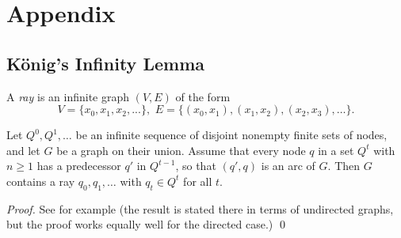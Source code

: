 \documentclass{llncs}
\begin{document}



\newpage
\appendix
\section{Appendix}


\subsection{K\"onig's Infinity Lemma}


A \emph{ray} is an infinite graph $(V, E)$ of the form
$$ V = \{x_0,x_1,x_2,...\}	,\,\, E = \{(x_0, x_1), (x_1, x_2), (x_2, x_3), \ldots\}. $$


\begin{koenig}
Let	$Q^0, Q^1, \ldots$ be an infinite sequence of disjoint nonempty finite sets of nodes, and let $G$ be a graph on their union. Assume that every node $q$ in a set $Q^t$ with $n \ge 1$ has a predecessor $q'$ in $Q^{t-1}$, so that $(q', q)$ is an arc of $G$. Then $G$ contains a ray $q_0, q_1, \ldots $ with $q_t \in Q^t$ for all $t$. 
\end{koenig}
\begin{proof}
See for example \cite[Lemma 8.1.2]{Diestel:2005} (the result is stated there in terms of undirected graphs, but the proof works equally well for the directed case.)  
\qed
\end{proof}
\end{document}
